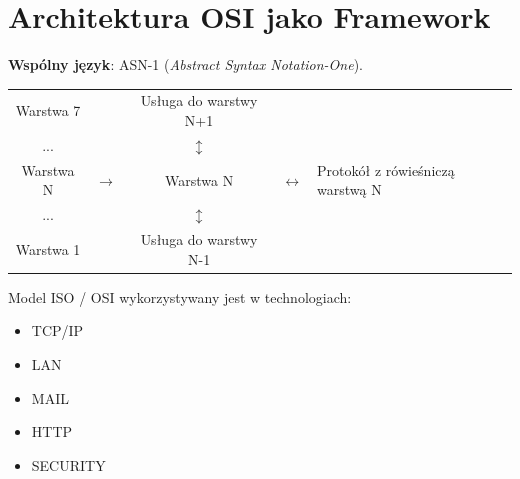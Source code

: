 	\section{Architektura OSI jako Framework}
		\textbf{Wspólny język}: ASN-1 (\emph{Abstract Syntax Notation-One}).\\
		\begin{table}[h]
			\begin{tabular}{|c|lcll}
				\cline{1-1}
				Warstwa 7 &                       & Usługa do warstwy N+1          &  &                                   \\ \cline{1-1}
				...       &                       & $ \updownarrow $                   &  &                                   \\ \cline{1-1} \cline{3-3}
				Warstwa N & \multicolumn{1}{l|}{$ \rightarrow $} & \multicolumn{1}{c|}{Warstwa N} & $ \longleftrightarrow $  & Protokół z rówieśniczą warstwą N \\ \cline{1-1} \cline{3-3}
				...       &                       & $ \updownarrow $                   &  &                                   \\ \cline{1-1}
				Warstwa 1 &                       & Usługa do warstwy N-1          &  &                                   \\ \cline{1-1}
			\end{tabular}
		\end{table}
		Model ISO / OSI wykorzystywany jest w technologiach:\\
		\begin{itemize}
			\item TCP/IP
			\item LAN
			\item MAIL
			\item HTTP
			\item SECURITY
		\end{itemize}


